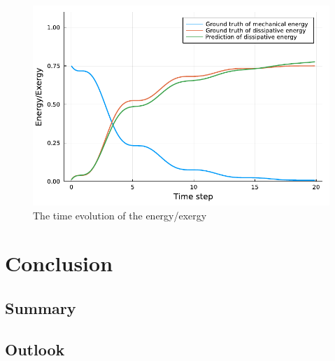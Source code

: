 \documentclass[
	parskip, 			   %
	twoside, 			   %
	DIV=14, 			   %
	BCOR=15.0mm, 		   %
	headsepline, 		   %
	open=right, 		   %
	captions=tableheading, %
	bibliography=totoc,    %
	numbers=noenddot       %
]{scrreprt}
\begin{document}
\begin{figure}[h!]
    \centering
    \includegraphics[scale=1]{figures/idho_energy_evolution.pdf}
    \caption{The time evolution of the energy/exergy}
    \label{fig:idho_energy_evolution}
\end{figure}


\clearpage
\chapter{Conclusion}
\label{ch:chapter8}
\section{Summary}
\section{Outlook}



\renewcommand{\bibname}{References} %



\appendix
\end{document}
